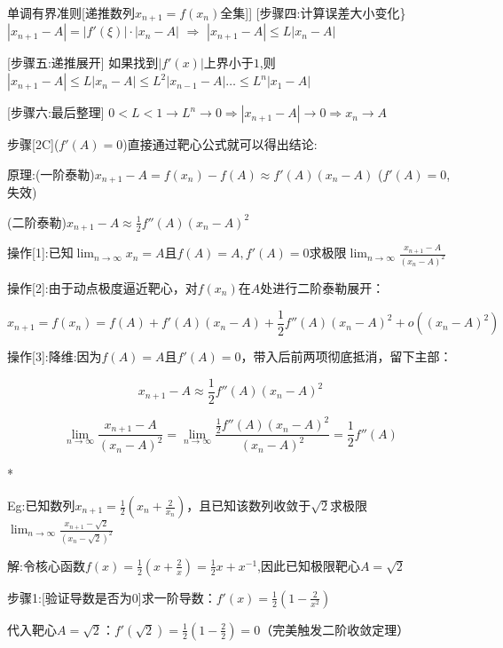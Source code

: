 \documentclass[11pt,a4paper,UTF8]{ctexart}
\begin{document}
\begin{thmbox}[[5]单调有界准则[递推数列$x_{n+1} = f(x_n)$全集]]
[步骤四:计算误差大小变化\}	$|x_{n+1} - A| = |f'(\xi)| \cdot |x_n - A|$ $\Rightarrow$ $|x_{n+1} - A| \le L|x_n - A|$

[步骤五:递推展开]		 如果找到$|f'(x)|$上界小于$1$,则$|x_{n+1} - A| \le L|x_n - A| \le L^2|x_{n-1} - A| \dots \le L^n|x_1 - A|$

[步骤六:最后整理] 		$0 < L < 1 \to L^n \to 0 \Rightarrow |x_{n+1} - A| \to 0 \Rightarrow x_n \to A$

\textit{}步骤[2C]($f'(A)=0$)直接通过靶心公式就可以得出结论:\textit{}

原理:(一阶泰勒)$x_{n+1}-A = f(x_n)-f(A) \approx f'(A)(x_n-A)$	($f'(A)=0$,失效)

   (二阶泰勒)$x_{n+1}-A \approx \frac{1}{2}f''(A)(x_n-A)^2$	

操作[1]:已知$\lim_{n \to \infty} x_n = A$且$f(A)=A, f'(A)=0$求极限$\lim_{n \to \infty} \frac{x_{n+1}-A}{(x_n-A)^2}$

操作[2]:由于动点极度逼近靶心，对$f(x_n)$在$A$处进行二阶泰勒展开：

  
\begin{equation*}
x_{n+1} = f(x_n) = f(A) + f'(A)(x_n-A) + \frac{1}{2}f''(A)(x_n-A)^2 + o((x_n-A)^2)
\end{equation*}


操作[3]:降维:因为$f(A)=A$且$f'(A)=0$，带入后前两项彻底抵消，留下主部：

  
\begin{equation*}
x_{n+1} - A \approx \frac{1}{2}f''(A)(x_n-A)^2
\end{equation*}


  
\begin{equation*}
\lim_{n \to \infty} \frac{x_{n+1}-A}{(x_n-A)^2} = \lim_{n \to \infty} \frac{\frac{1}{2}f''(A)(x_n-A)^2}{(x_n-A)^2} = \frac{1}{2}f''(A)
\end{equation*}


\textit{}*

Eg:已知数列$x_{n+1} = \frac{1}{2}(x_n + \frac{2}{x_n})$，且已知该数列收敛于$\sqrt{2}$求极限$\lim_{n \to \infty} \frac{x_{n+1}-\sqrt{2}}{(x_n-\sqrt{2})^2}$

解:令核心函数$f(x) = \frac{1}{2}(x + \frac{2}{x})= \frac{1}{2}x + x^{-1}$,因此已知极限靶心$A = \sqrt{2}$

步骤1:[验证导数是否为0]求一阶导数：$f'(x) = \frac{1}{2}(1 - \frac{2}{x^2})$

  代入靶心$A = \sqrt{2}$：$f'(\sqrt{2}) = \frac{1}{2}(1 - \frac{2}{2}) = 0$（完美触发二阶收敛定理）


\end{thmbox}
\end{document}
